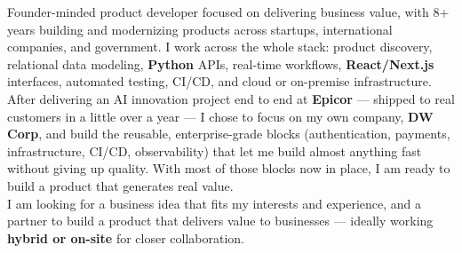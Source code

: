 \documentclass[10pt,a4paper]{altacv}
\begin{document}

\begin{fullwidth}
\makecvheader
\end{fullwidth}



Founder-minded product developer focused on delivering business value, with 8+ years building and modernizing products across startups, international companies, and government. I work across the whole stack: product discovery, relational data modeling, \textbf{Python} APIs, real-time workflows, \textbf{React/Next.js} interfaces, automated testing, CI/CD, and cloud or on-premise infrastructure. \\

After delivering an AI innovation project end to end at \textbf{Epicor} — shipped to real customers in a little over a year — I chose to focus on my own company, \textbf{DW Corp}, and build the reusable, enterprise-grade blocks (authentication, payments, infrastructure, CI/CD, observability) that let me build almost anything fast without giving up quality. With most of those blocks now in place, I am ready to build a product that generates real value. \\

I am looking for a business idea that fits my interests and experience, and a partner to build a product that delivers value to businesses — ideally working \textbf{hybrid or on-site} for closer collaboration. \\
\end{document}
